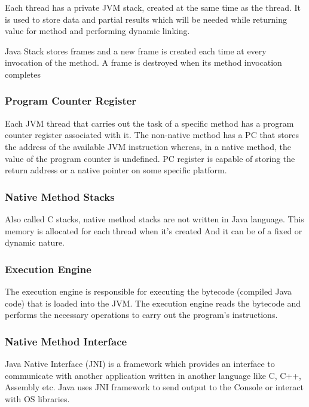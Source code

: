 \documentclass{article}
\begin{document}
Each thread has a private JVM stack, created at the same time as the thread. It is used to store data and partial results which will be needed while returning value for method and performing dynamic linking.

Java Stack stores frames and a new frame is created each time at every invocation of the method. A frame is destroyed when its method invocation completes

\subsubsection{Program Counter Register}

Each JVM thread that carries out the task of a specific method has a program counter register associated with it. The non-native method has a PC that stores the address of the available JVM instruction whereas, in a native method, the value of the program counter is undefined. PC register is capable of storing the return address or a native pointer on some specific platform.

\subsubsection{Native Method Stacks}

Also called C stacks, native method stacks are not written in Java language. This memory is allocated for each thread when it’s created And it can be of a fixed or dynamic nature.

\subsubsection{Execution Engine}

The execution engine is responsible for executing the bytecode (compiled Java code) that is loaded into the JVM. The execution engine reads the bytecode and performs the necessary operations to carry out the program’s instructions.

\subsubsection{Native Method Interface}

Java Native Interface (JNI) is a framework which provides an interface to communicate with another application written in another language like C, C++, Assembly etc. Java uses JNI framework to send output to the Console or interact with OS libraries.
\end{document}
